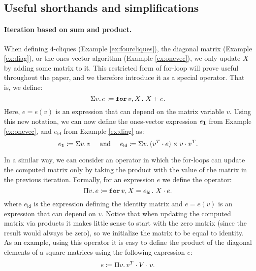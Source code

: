 \subsection{Useful shorthands and simplifications}\label{sec:queries:simp}

\paragraph{Iteration based on sum and product.} When defining $4$-cliques (Example \ref{ex:fourcliques}), the diagonal matrix (Example \ref{ex:diag}), or the ones vector algorithm (Example \ref{ex:onevec}), we 
 only update $X$ by adding some matrix to it. This restricted form of for-loop will prove useful throughout the paper, and we therefore introduce it as a special operator. That is, we define:
$$\Sigma v. \, e \coloneqq  \texttt{for}\, v,X \texttt{.}\, X + e.$$
Here, $e=e(v)$ is an expression that can depend on the matrix variable $v$. 
Using this new notation, we can now define the ones-vector expression $e_{\mathbf{1}}$ from Example \ref{ex:onevec}, and $e_\mathsf{Id}$ from Example \ref{ex:diag} as:
\[ e_{\ones} \coloneqq  \Sigma v. \, v \ \ \ \text{ and } \ \ \ 
e_\mathsf{Id} \coloneqq  \Sigma v. \, (v^T\cdot e)\times v\cdot v^T.
\]

In a similar way, we can consider an operator in which the for-loops can update the computed matrix only by taking the product with the value of the matrix in the previous iteration. Formally, for an expression $e$ we define the operator:
$$
\Pi v.\,  e \coloneqq \texttt{for}\, v,X = e_{\mathsf{Id}} \texttt{.}\, X\cdot e.
$$
where $e_{\mathsf{Id}}$ is the expression defining the identity matrix and $e=e(v)$ is an expression that can depend on $v$. Notice that when updating the computed matrix via products it makes little sense to start with the zero matrix (since the result would always be zero), so we initialize the matrix to be equal to identity. 
As an example, using this operator it is easy to define the product of the diagonal elements of a square matrices using the following expression $e$:
$$
e \coloneqq  \Pi v. \, v^T\cdot V \cdot v.
$$

